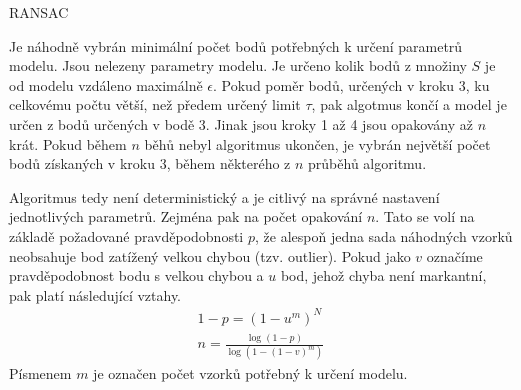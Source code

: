 \documentclass[twoside]{ctuthesis}
\begin{document}
\begin{algorithm}
    \caption{RANSAC}
    \label{alg:RANSAC}
    \begin{algorithmic}[1]
        \STATE Je náhodně vybrán minimální počet bodů potřebných k určení parametrů modelu.
        \STATE Jsou nelezeny parametry modelu.
        \STATE Je určeno kolik bodů z množiny $S$ je od modelu vzdáleno maximálně $\epsilon$. 
        \STATE Pokud poměr bodů, určených v kroku 3, ku celkovému počtu větší, než předem určený limit $\tau$, pak algotmus končí a model je určen z bodů určených v bodě 3.
        \STATE Jinak jsou kroky 1 až 4 jsou opakovány až $n$ krát.
        \STATE Pokud během $n$ běhů nebyl algoritmus ukončen, je vybrán největší počet bodů získaných v kroku 3, během některého z $n$ průběhů algoritmu.
    \end{algorithmic}
\end{algorithm}

Algoritmus tedy není deterministický a je citlivý na správné nastavení jednotlivých parametrů. Zejména pak na počet opakování $n$. Tato se volí na základě požadované pravděpodobnosti $p$, že alespoň jedna sada náhodných vzorků neobsahuje bod zatížený velkou chybou (tzv. outlier). Pokud jako $v$ označíme pravděpodobnost bodu s velkou chybou a $u$ bod, jehož chyba není markantní, pak platí následující vztahy. \cite{fischler1981random}
\begin{align}
    1 - p = (1 - u^m)^N \\
    n = \frac{\log(1 - p)}{\log(1 - (1 - v)^m)}
\end{align}
Písmenem $m$ je označen počet vzorků potřebný k určení modelu. 


\end{document}
